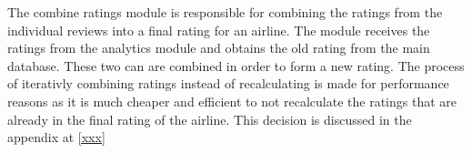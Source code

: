 The combine ratings module is responsible for combining the ratings from the individual reviews into a final rating for an airline. The module receives the ratings from the analytics module and obtains the old rating from the main database. These two can are combined in order to form a new rating. The process of iterativly combining ratings instead of recalculating is made for performance reasons as it is much cheaper and efficient to not recalculate the ratings that are already in the final rating of the airline. This decision is discussed in the appendix at \ref{xxx}

